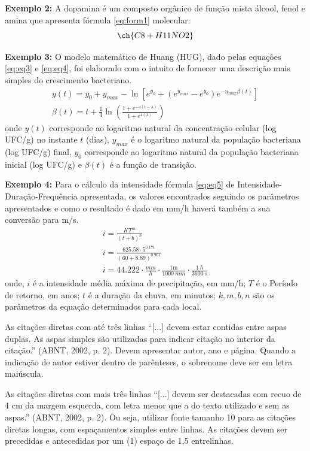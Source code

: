 \textbf{Exemplo 2:}
A dopamina é um composto orgânico de função mista álcool, fenol e amina que apresenta fórmula \eqref{eq:form1} molecular:
\begin{equation} \label{eq:form1}
\ch{C8 + H11NO2} 
\end{equation}

\textbf{Exemplo 3:}
O modelo matemático de Huang (HUG), dado pelas equações \eqref{eq:eq3} e \eqref{eq:eq4}, foi elaborado com o intuito de fornecer uma descrição mais simples do crescimento bacteriano.
\begin{gather} 
	y(t) = y_0 + y_{max} -\ln{[e^{y_0}  + (e^{y_{max}} -e^{y_0} )  e^{-u_{max}\beta(t)} ]}   \label{eq:eq3}  \\
	\beta(t) = t + \frac{1}{4}\ln\left( \frac{1+ e^{-4(t-\lambda)} }{1+ e^{4(\lambda)} }\right) \label{eq:eq4}
\end{gather}
\noindent onde $y(t)$ corresponde ao logaritmo natural da concentração celular (log UFC/g) no instante $t$ (dias), $y_{max}$ é o logaritmo natural da população bacteriana (log UFC/g) final, $y_0$ corresponde ao logaritmo natural da população bacteriana inicial (log UFC/g) e $\beta(t)$ é a função de transição.

\textbf{Exemplo 4:}
Para o cálculo da intensidade fórmula \eqref{eq:eq5} de Intensidade-Duração-Frequência apresentada, os valores encontrados seguindo os parâmetros apresentados e como o resultado é dado em mm/h haverá também a sua conversão para m/s.
\begin{gather} 
	i = \frac{K T^m}{(t+b)^n}   \label{eq:eq5}  \\[2ex]
		i = \frac{\num{625.58} \cdot 5^{\num{0.171}}  }{(60+\num{8.89})^{\num{0.961}}} \\[2ex]
		i = \num{44.222} \cdot \frac{\si{mm}}{\si{h}} \cdot \frac{1\mathrm{m}}{\SI{1000}{mm}} \cdot \frac{\SI{1}{h}}{\SI{3600}{s}} 	
\end{gather}
\noindent onde, $i$ é a intensidade média máxima de precipitação, em mm/h; $T$ é o Período de retorno, em anos; $t$ é a duração da chuva, em minutos; $k,m,b,n$ são os parâmetros da equação determinados para cada local.


As citações diretas com até três linhas ``[...] devem estar contidas entre aspas duplas. As aspas simples são utilizadas para indicar citação no interior da citação.'' (ABNT, 2002, p. 2). Devem apresentar autor, ano e página. Quando a indicação de autor estiver dentro de parênteses, o sobrenome deve ser em letra maiúscula. 


As citações diretas com mais três linhas ``[...] devem ser destacadas com recuo de 4 cm da margem esquerda, com letra menor que a do texto utilizado e sem as aspas.'' (ABNT, 2002, p. 2). Ou seja, utilizar fonte tamanho 10 para as citações diretas longas, com espaçamentos simples entre linhas. As citações devem ser precedidas e antecedidas por um (1) espaço de 1,5 entrelinhas. 

